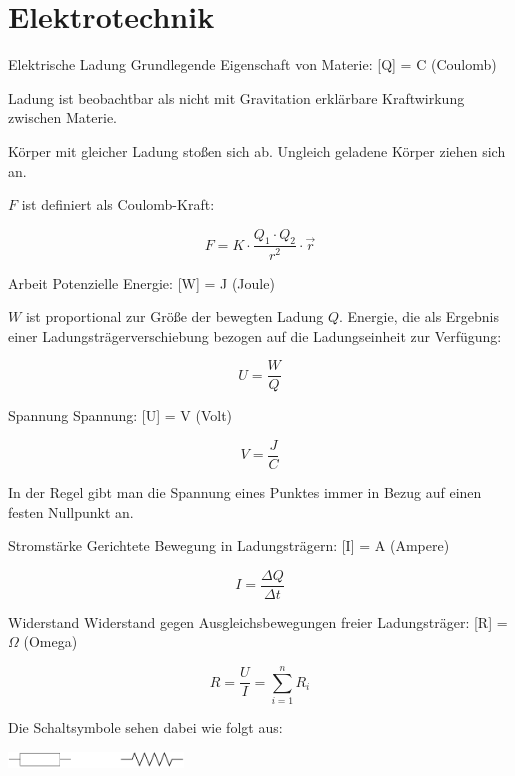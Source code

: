 \section{Elektrotechnik}

\begin{defi}{Elektrische Ladung}
    Grundlegende Eigenschaft von Materie: [Q] = C (Coulomb)

    Ladung ist beobachtbar als nicht mit Gravitation erklärbare Kraftwirkung zwischen Materie.

    Körper mit gleicher Ladung stoßen sich ab.
    Ungleich geladene Körper ziehen sich an.

    $F$ ist definiert als Coulomb-Kraft:

    \[
        F = K \cdot \frac{Q_1 \cdot Q_2}{r^2} \cdot \vec{r}
    \]
\end{defi}

\begin{defi}{Arbeit}
    Potenzielle Energie: [W] = J (Joule)

    $W$ ist proportional zur Größe der bewegten Ladung $Q$.
    Energie, die als Ergebnis einer Ladungsträgerverschiebung bezogen auf die Ladungseinheit zur Verfügung:

    \[
        U = \frac{W}{Q}
    \]
\end{defi}

\begin{defi}{Spannung}
    Spannung: [U] = V (Volt)

    \[
        V = \frac{J}{C}
    \]

    In der Regel gibt man die Spannung eines Punktes immer in Bezug auf einen festen Nullpunkt an.
\end{defi}

\begin{defi}{Stromstärke}
    Gerichtete Bewegung in Ladungsträgern: [I] = A (Ampere)

    \[
        I = \frac{\Delta Q}{\Delta t}
    \]
\end{defi}

\begin{defi}{Widerstand}
    Widerstand gegen Ausgleichsbewegungen freier Ladungsträger: [R] = $\Omega$ (Omega)

    \[
        R = \frac{U}{I} = \sum_{i = 1}^n R_i
    \]

    Die Schaltsymbole sehen dabei wie folgt aus:

    \begin{center}
        \includegraphics[width=0.35\textwidth]{includes/figures/defi_widerstand.pdf}
    \end{center}
\end{defi}


